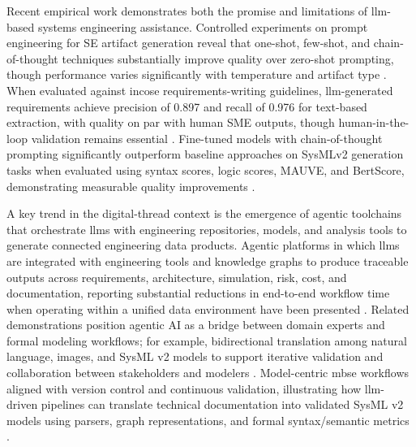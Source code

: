 Recent empirical work demonstrates both the promise and limitations of \ac{llm}-based systems engineering assistance. Controlled experiments on prompt engineering for SE artifact generation reveal that one-shot, few-shot, and chain-of-thought techniques substantially improve quality over zero-shot prompting, though performance varies significantly with temperature and artifact type \cite{SmithCrabb_Jones_Bernard_Prompt_Technique_SE_Artifacts_2024}. When evaluated against \ac{incose} requirements-writing guidelines, \ac{llm}-generated requirements achieve precision of 0.897 and recall of 0.976 for text-based extraction, with quality on par with human SME outputs, though human-in-the-loop validation remains essential \cite{Stein_Leveraging_LLMs_Requirements_Generation_SE_Guidelines_2025}. Fine-tuned models with chain-of-thought prompting significantly outperform baseline approaches on SysMLv2 generation tasks when evaluated using syntax scores, logic scores, MAUVE, and BertScore, demonstrating measurable quality improvements \cite{Wach_LLMs_Accelerate_Complex_Systems_2024}.

A key trend in the digital-thread context is the emergence of agentic toolchains that orchestrate \acp{llm} with engineering repositories, models, and analysis tools to generate connected engineering data products. Agentic platforms in which \acp{llm} are integrated with engineering tools and knowledge graphs to produce traceable outputs across requirements, architecture, simulation, risk, cost, and documentation, reporting substantial reductions in end-to-end workflow time when operating within a unified data environment have been presented \cite{Helmerich_Transforming_Systems_Engineering_Agentic_AI_2025}. Related demonstrations position agentic AI as a bridge between domain experts and formal modeling workflows; for example, bidirectional translation among natural language, images, and SysML v2 models to support iterative validation and collaboration between stakeholders and modelers \cite{Wach_GenGroves_Bridge_Systems_Engineers_Domain_Experts_2025}. Model-centric \ac{mbse} workflows aligned with version control and continuous validation, illustrating how \ac{llm}-driven pipelines can translate technical documentation into validated SysML v2 models using parsers, graph representations, and formal syntax/semantic metrics \cite{Traveller_Agile_Engineering_Agentic_Co_Modelers_2025}.

